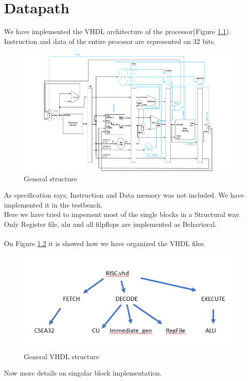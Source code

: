 \chapter{Datapath}
We have implemented the VHDL architecture of the processor(Figure \ref{fig2.1}).
Instruction and data of the entire procssor are represented on 32 bits. 
\begin{figure}[h!]
	\centering
	\includegraphics[width=18cm]{./images/structure}
	\caption{General structure}
	\label{fig2.1}
\end{figure}
As specification says, Instruction and Data memory was not included. We have implemented it in the testbench.\\
Here we have tried to impement most of the single blocks in a Structural way. \\
Only Register file, alu and all filpflops are implemented as Behavioral.\\
\\
On Figure \ref{fig2.2} it is showed how we have organized the VHDL files.
\begin{figure}[h!]
	\centering
	\includegraphics[width=15cm]{./images/VHDL_structure}
	\caption{General VHDL structure}
	\label{fig2.2}
\end{figure}
Now more details on singolar block implementation.
